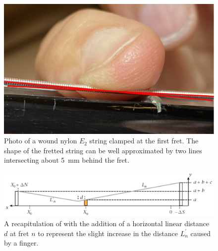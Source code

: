 \begin{figure}
    \centering
    \includegraphics[width=6.0in]{../figures/fretting_photo}
    \caption{\label{fig:fretting_photo} Photo of a wound nylon $E_2$ string clamped at the first fret. The shape of the fretted string can be well approximated by two lines intersecting about 5~mm behind the fret.}
\end{figure}

\begin{figure}
    \centering
    \includegraphics[width=6.0in]{../figures/fretting_schematic}
    \caption{\label{fig:fretting_schematic} A recapitulation of  with the addition of a horizontal linear distance $d$ at fret $n$ to represent the slight increase in the distance $L_n^\prime$ caused by a finger.}
\end{figure}

